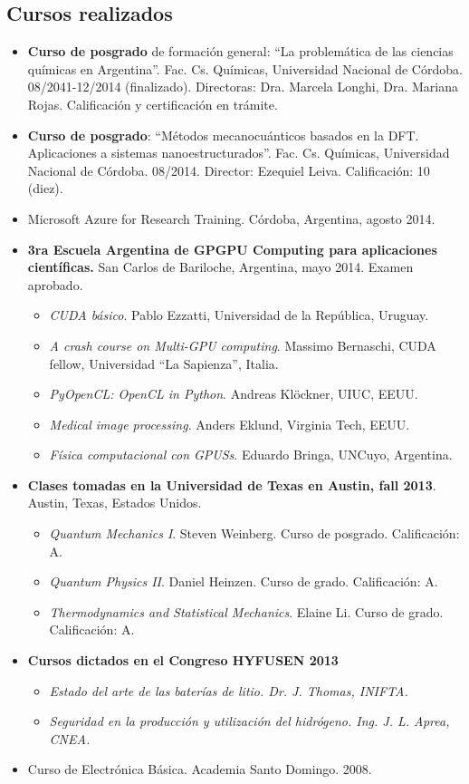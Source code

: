 \documentclass[10pt]{article}
\begin{document}
\subsection{Cursos realizados}
 \begin{itemize}
  \item {\bf Curso de posgrado} de formación general: ``La problemática de las ciencias químicas en Argentina''. Fac. Cs. Químicas, Universidad Nacional de Córdoba. 08/2041-12/2014 (finalizado). Directoras: Dra. Marcela Longhi, Dra. Mariana Rojas. Calificación y certificación en trámite.
  \item {\bf Curso de posgrado}: ``Métodos mecanocuánticos basados en la DFT. Aplicaciones a sistemas nanoestructurados''. Fac. Cs. Químicas, Universidad Nacional de Córdoba. 08/2014. Director: Ezequiel Leiva. Calificación: 10 (diez).
  \item {Microsoft Azure for Research Training.} Córdoba, Argentina, agosto 2014. 
  \item {\bf 3ra Escuela Argentina de GPGPU Computing para aplicaciones científicas.} San Carlos de Bariloche, Argentina, mayo 2014. Examen aprobado.
   \begin{itemize}
   \item {\it CUDA básico}. Pablo Ezzatti, Universidad de la República, Uruguay. 
   \item {\it A crash course on Multi-GPU computing}. Massimo Bernaschi, CUDA fellow, Universidad ``La Sapienza'', Italia.
   \item {\it PyOpenCL: OpenCL in Python}. Andreas Klöckner, UIUC, EEUU.
   \item {\it Medical image processing}. Anders Eklund, Virginia Tech, EEUU.
   \item {\it Física computacional con GPUSs}. Eduardo Bringa, UNCuyo, Argentina.
   \end{itemize}
  \item {\bf Clases tomadas en la Universidad de Texas en Austin, fall 2013}. Austin, Texas, Estados Unidos.
   \begin{itemize}
    \item {\it Quantum Mechanics I}. Steven Weinberg. Curso de posgrado. Calificación: A.
    \item {\it Quantum Physics II}. Daniel Heinzen. Curso de grado. Calificación: A.
    \item {\it Thermodynamics and Statistical Mechanics}. Elaine Li. Curso de grado. Calificación: A.
   \end{itemize}
  \item {\bf Cursos dictados en el Congreso HYFUSEN 2013}
  \begin{itemize}
   \item {\it Estado del arte de las baterías de litio. Dr. J. Thomas, INIFTA.}
   \item {\it Seguridad en la producción y utilización del hidrógeno. Ing. J. L. Aprea, CNEA.}
  \end{itemize} 
  \item {Curso de Electrónica Básica}. Academia Santo Domingo. 2008.
 \end{itemize}
\end{document}
